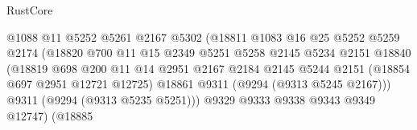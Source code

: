 \begin{lexlean}{RustCore}
\begin{coremodule}
                                            @1088
                                            @11
                                            @5252
                                            @5261
                                            @2167
                                            @5302
                                            (@18811
                                              @1083
                                              @16
                                              @25
                                              @5252
                                              @5259
                                              @2174
                                              (@18820
                                                @700
                                                @11
                                                @15
                                                @2349
                                                @5251
                                                @5258
                                                @2145
                                                @5234
                                                @2151
                                                @18840
                                                (@18819
                                                  @698
                                                  @200
                                                  @11
                                                  @14
                                                  @2951
                                                  @2167
                                                  @2184
                                                  @2145
                                                  @5244
                                                  @2151
                                                  (@18854 @697 @2951 @12721 @12725)
                                                  @18861
                                                  @9311
                                                  (@9294 (@9313 @5245 @2167)))
                                                @9311
                                                (@9294 (@9313 @5235 @5251)))
                                              @9329
                                              @9333
                                              @9338
                                              @9343
                                              @9349
                                              @12747)
                                            (@18885

\end{coremodule}
\end{lexlean}
